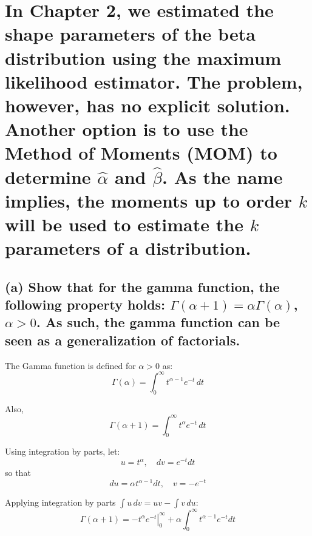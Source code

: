 \newpage


\section{In Chapter 2, we estimated the shape parameters of the beta distribution using the maximum likelihood estimator. The problem, however, has no explicit solution. Another option is to use the Method of Moments (MOM) to determine $\hat{\alpha}$ and $\hat{\beta}$. As the name implies, the moments up to order $k$ will be used to estimate the $k$ parameters of a distribution.}



\subsection*{(a) Show that for the gamma function, the following property holds: $\Gamma(\alpha + 1) = \alpha \Gamma(\alpha)$, $\alpha > 0$. As such, the gamma function can be seen as a generalization of factorials.}

The Gamma function is defined for \(\alpha > 0\) as:
\begin{equation}
\Gamma(\alpha) = \int_0^\infty t^{\alpha - 1} e^{-t} \, dt
\end{equation}



Also,
\begin{equation}
\Gamma(\alpha + 1) = \int_0^\infty t^{\alpha} e^{-t} \, dt
\end{equation}

Using integration by parts, let:
\begin{equation}
u = t^{\alpha}, \quad dv = e^{-t} dt
\end{equation}
so that
\begin{equation}
du = \alpha t^{\alpha - 1} dt, \quad v = -e^{-t}
\end{equation}

Applying integration by parts $\int u \, dv = uv - \int v \, du$:
\begin{equation}
\Gamma(\alpha + 1) = \left. -t^{\alpha} e^{-t} \right|_0^\infty + \alpha \int_0^\infty t^{\alpha - 1} e^{-t} dt
\end{equation}

